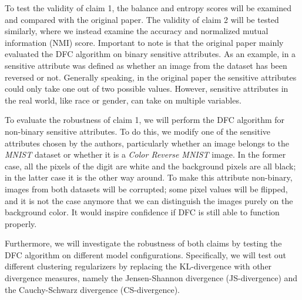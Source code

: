 
To test the validity of claim 1, the balance and entropy scores will be examined and compared with the original paper. The validity of claim 2 will be tested similarly, where we instead examine the accuracy and normalized mutual information (NMI) score.
Important to note is that the original paper mainly evaluated the DFC algorithm on binary sensitive attributes. As an example, in \citet{Li_2020_CVPR} a sensitive attribute was defined as whether an image from the \mn dataset has been reversed or not. Generally speaking, in the original paper the sensitive attributes could only take one out of two possible values. However, sensitive attributes in the real world, like race or gender, can take on multiple variables. 

To evaluate the robustness of claim 1, we will perform the DFC algorithm for non-binary sensitive attributes. To do this, we modify one of the sensitive attributes chosen by the authors, particularly whether an image belongs to the \textit{MNIST} dataset or whether it is a \textit{Color Reverse MNIST} image. In the former case, all the pixels of the digit are white and the background pixels are all black; in the latter case it is the other way around. To make this attribute non-binary, images from both datasets will be corrupted; some pixel values will be flipped, and it is not the case anymore that we can distinguish the images purely on the background color. It would inspire confidence if DFC is still able to function properly. 

Furthermore, we will investigate the robustness of both claims by testing the DFC algorithm on different model configurations. Specifically, we will test out different clustering regularizers by replacing the KL-divergence with other divergence measures, namely the Jensen-Shannon divergence (JS-divergence) and the Cauchy-Schwarz divergence (CS-divergence).

